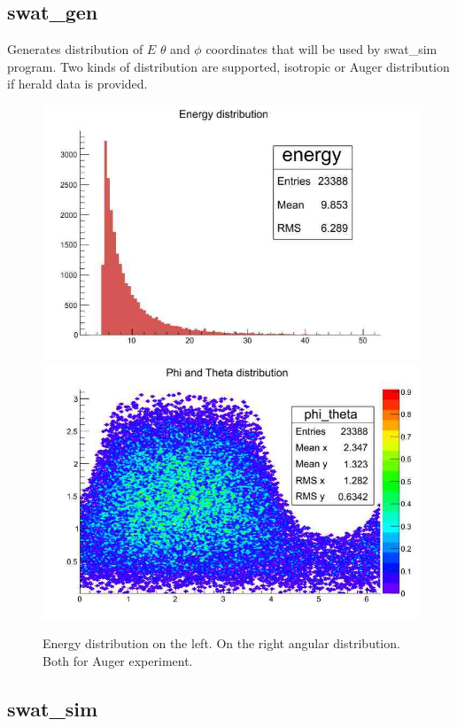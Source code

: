 \documentclass[12pt]{article}
\begin{document}
\subsection{swat\_gen}
Generates distribution of $E$ $\theta$ and $\phi$ coordinates that
will be used by swat\_sim program. Two kinds of distribution are
supported, isotropic or Auger distribution if herald data is provided.
\begin{figure}[ht]
   \centering
      \includegraphics[scale=0.25]{energy.jpg}
      \includegraphics[scale=0.25]{phi_theta.jpg}
   \caption{Energy distribution on the left. On the right
   angular distribution. Both for Auger experiment.}
   \label{healpix}
\end{figure}

\subsection{swat\_sim}
\end{document}
